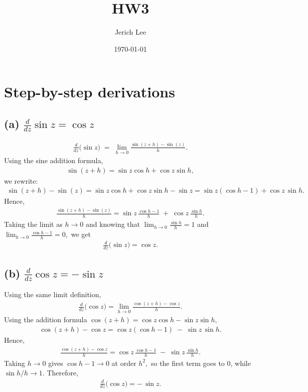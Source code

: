 \documentclass[12pt]{article}
\title{HW3}
\author{Jerich Lee}
\date{\today}
\theoremstyle{definition} %
\theoremstyle{plain} %
\begin{document}
\maketitle
\section*{Step-by-step derivations}

\subsection*{(a) $\displaystyle \frac{d}{dz} \sin z = \cos z$}

\begin{align}
\frac{d}{dz}\bigl(\sin z\bigr)
  \;=\;
  \lim_{h\to 0}\frac{\sin(z + h) - \sin(z)}{h}.
\end{align}
Using the sine addition formula,
\begin{align}
\sin(z + h) = \sin z \cos h + \cos z \sin h,
\end{align}
we rewrite:
\begin{align}
\sin(z + h) - \sin(z) 
  = \sin z \cos h + \cos z \sin h - \sin z 
  = \sin z(\cos h - 1) + \cos z\,\sin h.
\end{align}
Hence,
\begin{align}
\frac{\sin(z + h) - \sin(z)}{h}
  = \sin z \,\frac{\cos h - 1}{h} \;+\; \cos z \,\frac{\sin h}{h}.
\end{align}
Taking the limit as $h \to 0$ and knowing that 
$\displaystyle \lim_{h\to 0}\frac{\sin h}{h} = 1$ 
and 
$\displaystyle \lim_{h\to 0}\frac{\cos h - 1}{h} = 0,$ 
we get
\begin{align}
\frac{d}{dz}\bigl(\sin z\bigr) = \cos z.
\end{align}

\subsection*{(b) $\displaystyle \frac{d}{dz} \cos z = - \sin z$}

Using the same limit definition,
\begin{align}
\frac{d}{dz}\bigl(\cos z\bigr)
  = \lim_{h \to 0} \frac{\cos(z + h) - \cos z}{h}.
\end{align}
Using the addition formula 
$\cos(z + h) = \cos z \cos h - \sin z \sin h,$
\begin{align}
\cos(z + h) - \cos z 
  = \cos z(\cos h - 1) \;-\; \sin z \,\sin h.
\end{align}
Hence,
\begin{align}
\frac{\cos(z + h) - \cos z}{h}
  = \cos z \,\frac{\cos h - 1}{h}
    \;-\; \sin z \,\frac{\sin h}{h}.
\end{align}
Taking $h \to 0$ gives $\cos h - 1 \to 0$ at order $h^2,$ so the first term goes to $0$, while $\sin h / h \to 1$.  Therefore,
\begin{align}
\frac{d}{dz}\bigl(\cos z\bigr) 
  = -\,\sin z.
\end{align}
\end{document}

